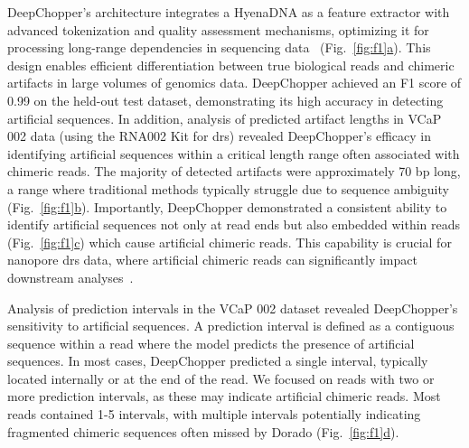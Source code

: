 \documentclass[pdflatex, sn-mathphys-num, lineno]{sn-jnl}%
\newcommand{\figref}[2]{Fig.~\hyperref[#1]{\ref*{#1}#2}}
\theoremstyle{thmstyleone}%
\theoremstyle{thmstyletwo}%
\theoremstyle{thmstylethree}%
\begin{document}
DeepChopper's architecture integrates a HyenaDNA as a feature extractor with advanced tokenization and quality assessment mechanisms, optimizing it for processing long-range dependencies in sequencing data~\cite{nguyen2024hyenadna} (\figref{fig:f1}{a}).
This design enables efficient differentiation between true biological reads and chimeric artifacts in large volumes of genomics data.
DeepChopper achieved an F1 score of 0.99 on the held-out test dataset, demonstrating its high accuracy in detecting artificial sequences.
In addition, analysis of predicted artifact lengths in VCaP 002 data (using the RNA002 Kit for \gls{drs}) revealed DeepChopper's efficacy in identifying artificial sequences within a critical length range often associated with chimeric reads.
The majority of detected artifacts were approximately 70 bp long, a range where traditional methods typically struggle due to sequence ambiguity (\figref{fig:f1}{b}).
Importantly, DeepChopper demonstrated a consistent ability to identify artificial sequences not only at read ends but also embedded within reads (\figref{fig:f1}{c}) which cause artificial chimeric reads.
This capability is crucial for nanopore \gls{drs} data, where artificial chimeric reads can significantly impact downstream analyses~\cite{smith2020molecular}.

Analysis of prediction intervals in the VCaP 002 dataset revealed DeepChopper's sensitivity to artificial sequences.
A prediction interval is defined as a contiguous sequence within a read where the model predicts the presence of artificial sequences.
In most cases, DeepChopper predicted a single interval, typically located internally or at the end of the read.
We focused on reads with two or more prediction intervals, as these may indicate artificial chimeric reads.
Most reads contained 1-5 intervals, with multiple intervals potentially indicating fragmented chimeric sequences often missed by Dorado (\figref{fig:f1}{d}).
\end{document}
